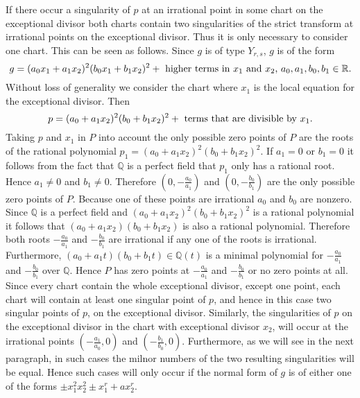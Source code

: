 \documentclass[noend]{amsproc}
\theoremstyle{definition}
\begin{document}
If there occur a singularity of $p$ at an irrational point in some chart on the
exceptional divisor both charts contain two singularities of the strict
transform at irrational points on the exceptional divisor. Thus it is only
necessary to consider one chart. This can be seen as follows. Since $g$ is of
type $Y_{r,s}$, $g$ is of the form
\[g=(a_0x_1+a_1x_2)^2(b_0x_1+b_1x_2)^2+\textnormal{ higher terms in $x_1$ and
$x_2$, $a_0,a_1,b_0,b_1\in\mathbb R$.}\] Without loss of generality we consider
the chart where $x_1$ is the local equation for the exceptional divisor. Then
\[p=(a_0+a_1x_2)^2(b_0+b_1x_2)^2+\textnormal{ terms that are divisible by
$x_1$.}\] Taking $p$ and $x_1$ in $P$ into account the only possible zero
points of $P$ are the roots of the rational polynomial $p_1 =
(a_0+a_1x_2)^2(b_0+b_1x_2)^2$. If $a_1=0$ or $b_1=0$ it follows from the fact
that $\mathbb Q$ is a perfect field that $p_1$ only has a rational root. Hence
$a_1\neq 0$ and $b_1\neq 0$. Therefore   $(0,-\frac{a_0}{a_1})$ and
$(0,-\frac{b_0}{b_1})$ are the only possible zero points of $P$. Because one of
these points are irrational $a_0$ and $b_0$ are nonzero. Since $\mathbb Q$ is a
perfect field and $(a_0+a_1x_2)^2(b_0+b_1x_2)^2$ is  a rational polynomial it
follows that $(a_0+a_1x_2)(b_0+b_1x_2)$ is also a rational polynomial.
Therefore both roots $-\frac{a_0}{a_1}$ and $-\frac{b_0}{b_1}$ are irrational
if any one of the roots is irrational. Furthermore,
$(a_0+a_1t)(b_0+b_1t)\in\mathbb Q(t)$ is a minimal polynomial for
$-\frac{a_0}{a_1}$ and $-\frac{b_0}{b_1}$ over $\mathbb Q$. Hence $P$ has zero
points at $-\frac{a_0}{a_1}$ and $-\frac{b_0}{b_1}$ or no zero points at all.
Since every chart contain the whole exceptional divisor, except one point, each
chart will contain at least one singular point of $p$, and hence in this case
two singular points of $p$, on the exceptional divisor. Similarly, the
singularities of $p$ on the exceptional divisor in the chart with exceptional
divisor $x_2$, will occur at the irrational points $(-\frac{a_1}{a_0},0)$ and
$(-\frac{b_1}{b_0},0)$. Furthermore, as we will see in the next paragraph, in
such cases the milnor numbers of the two resulting singularities will be equal.
Hence such cases will only occur if the normal form of $g$ is of either one of
the forms $\pm x_1^2x_2^2\pm x_1^r+ax_2^r$.
\end{document}
